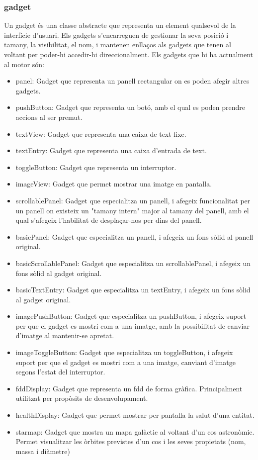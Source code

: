 \subsubsection{gadget}
Un gadget és una classe abstracte que representa un element qualsevol de la interfície d'usuari. Els gadgets s'encarreguen de gestionar la seva posició i tamany, la visibilitat, el nom, i mantenen enllaços als gadgets que tenen al voltant per poder-hi accedir-hi direccionalment.
Els gadgets que hi ha actualment al motor són:
\begin{itemize}
  \item{panel: Gadget que representa un panell rectangular on es poden afegir altres gadgets.}
  \item{pushButton: Gadget que representa un botó, amb el qual es poden prendre accions al ser premut.}
  \item{textView: Gadget que representa una caixa de text fixe.}
  \item{textEntry: Gadget que representa una caixa d'entrada de text.}
  \item{toggleButton: Gadget que representa un interruptor.}
  \item{imageView: Gadget que permet mostrar una imatge en pantalla.}
  \item{scrollablePanel: Gadget que especialitza un panell, i afegeix funcionalitat per un panell on existeix un "tamany intern" major al tamany del panell, amb el qual s'afegeix l'habilitat de desplaçar-nos per dins del panell.}
  \item{basicPanel: Gadget que especialitza un panell, i afegeix un fons sòlid al panell original.}
  \item{basicScrollablePanel: Gadget que especialitza un scrollablePanel, i afegeix un fons sòlid al gadget original.}
  \item{basicTextEntry: Gadget que especialitza un textEntry, i afegeix un fons sòlid al gadget original.}
  \item{imagePushButton: Gadget que especialitza un pushButton, i afegeix suport per que el gadget es mostri com a una imatge, amb la possibilitat de canviar d'imatge al mantenir-se apretat.}
  \item{imageToggleButton: Gadget que especialitza un toggleButton, i afegeix suport per que el gadget es mostri com a una imatge, canviant d'imatge segons l'estat del interruptor.}
  \item{fddDisplay: Gadget que representa un fdd de forma gràfica. Principalment utilitzat per propòsits de desenvolupament.}
  \item{healthDisplay: Gadget que permet mostrar per pantalla la salut d'una entitat.}
  \item{starmap: Gadget que mostra un mapa galàctic al voltant d'un cos astronòmic. Permet visualitzar les òrbites previstes d'un cos i les seves propietats (nom, massa i diàmetre)}
\end{itemize}
